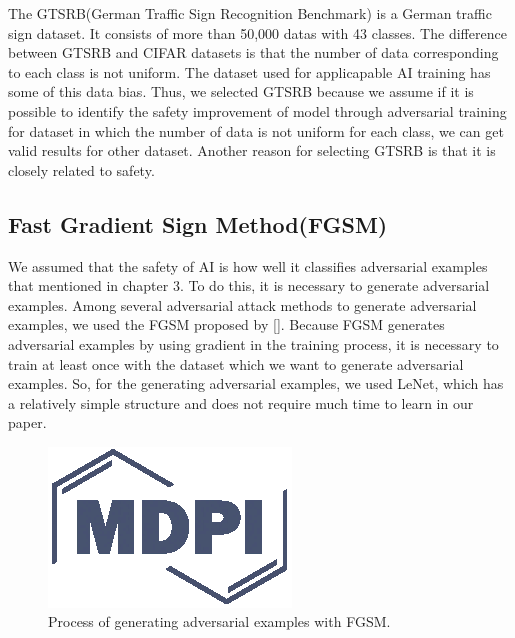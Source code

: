 \documentclass[journal,article,submit,moreauthors,pdftex]{Definitions/mdpi}
\begin{document}
The GTSRB(German Traffic Sign Recognition Benchmark) is a German traffic sign dataset. It consists of more than 50,000 datas with 43 classes.
The difference between GTSRB and CIFAR datasets is that the number of data corresponding to each class is not uniform.
The dataset used for applicapable AI training has some of this data bias.
Thus, we selected GTSRB because we assume if it is possible to identify the safety improvement of model through adversarial training for dataset in which the number of data is not uniform for each class, we can get valid results for other dataset.
Another reason for selecting GTSRB is that it is closely related to safety.

\subsection{Fast Gradient Sign Method(FGSM)}

We assumed that the safety of AI is how well it classifies adversarial examples that mentioned in chapter 3.
To do this, it is necessary to generate adversarial examples. Among several adversarial attack methods to generate adversarial examples, we used the FGSM proposed by [].
Because FGSM generates adversarial examples by using gradient in the training process, it is necessary to train at least once with the dataset which we want to generate adversarial examples.
So, for the generating adversarial examples, we used LeNet, which has a relatively simple structure and does not require much time to learn in our paper.

\begin{figure}[H] 
\includegraphics[width=5 cm]{Definitions/logo-mdpi}
\caption{Process of generating adversarial examples with FGSM.\label{fig4}}
\end{figure} 
\end{document}
